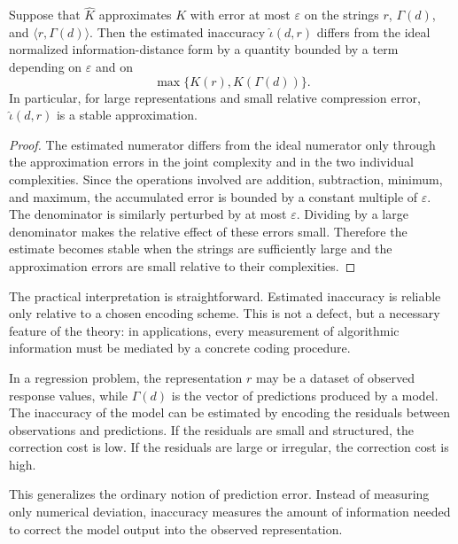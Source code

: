 \begin{proposition}
\label{prop:estimated_inaccuracy_consistency}
Suppose that \(\widehat K\) approximates \(K\) with error at most \(\varepsilon\) on the strings \(r\), \(\Gamma(d)\), and \(\langle r,\Gamma(d)\rangle\). Then the estimated inaccuracy \(\widehat{\iota}(d,r)\) differs from the ideal normalized information-distance form by a quantity bounded by a term depending on \(\varepsilon\) and on
\[
\max\{K(r),K(\Gamma(d))\}.
\]
In particular, for large representations and small relative compression error, \(\widehat{\iota}(d,r)\) is a stable approximation.
\end{proposition}

\begin{proof}
The estimated numerator differs from the ideal numerator only through the approximation errors in the joint complexity and in the two individual complexities. Since the operations involved are addition, subtraction, minimum, and maximum, the accumulated error is bounded by a constant multiple of \(\varepsilon\). The denominator is similarly perturbed by at most \(\varepsilon\). Dividing by a large denominator makes the relative effect of these errors small. Therefore the estimate becomes stable when the strings are sufficiently large and the approximation errors are small relative to their complexities.
\end{proof}

The practical interpretation is straightforward. Estimated inaccuracy is reliable only relative to a chosen encoding scheme. This is not a defect, but a necessary feature of the theory: in applications, every measurement of algorithmic information must be mediated by a concrete coding procedure.

\begin{example}
In a regression problem, the representation \(r\) may be a dataset of observed response values, while \(\Gamma(d)\) is the vector of predictions produced by a model. The inaccuracy of the model can be estimated by encoding the residuals between observations and predictions. If the residuals are small and structured, the correction cost is low. If the residuals are large or irregular, the correction cost is high.
\end{example}

This generalizes the ordinary notion of prediction error. Instead of measuring only numerical deviation, inaccuracy measures the amount of information needed to correct the model output into the observed representation.


